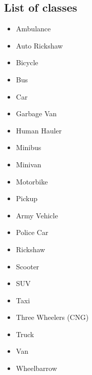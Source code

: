 \subsection{List of classes}
\begin{multicols}{2}
\begin{itemize}
\item Ambulance
\item Auto Rickshaw
\item Bicycle
\item Bus
\item Car
\item Garbage Van
\item Human Hauler
\item Minibus
\item Minivan
\item Motorbike
\item Pickup
\item Army Vehicle
\item Police Car
\item Rickshaw
\item Scooter
\item SUV
\item Taxi
\item Three Wheelers (CNG)
\item Truck
\item Van
\item Wheelbarrow
\end{itemize}
\end{multicols}



